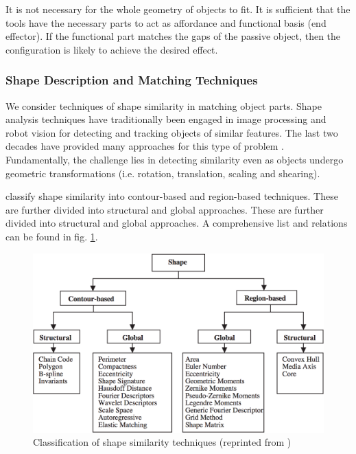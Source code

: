 \documentclass[
    floatsintext
]{article}
\begin{document}
It is not necessary for the whole geometry of objects to fit. 
It is sufficient that the tools have the necessary parts to act as affordance and functional basis (end effector\cite{zhu2015}).
If the functional part matches the gaps of the passive object, then the configuration is likely to achieve the desired effect. 

\subsubsection{Shape Description and Matching Techniques}
We consider techniques of shape similarity in matching object parts.
Shape analysis techniques have traditionally been engaged in image processing and robot vision for detecting and tracking objects of similar features.
The last two decades have provided many approaches for this type of problem \cite{loncaric1998,zhang2004,veltkamp2001,robert2012}.
Fundamentally, the challenge lies in detecting similarity even as objects undergo geometric transformations (i.e. rotation, translation, scaling and shearing).     

\cite{zhang2004} classify shape similarity into contour-based and region-based techniques. These are further divided into structural and global approaches.
These are further divided into structural and global approaches.
A comprehensive list and relations can be found in fig. \ref{fig:shape_similarity}. 

\begin{figure}[h]
  \centering
  \includegraphics[width=1\textwidth]{./figures/similarity_techniques.png}
  \caption{Classification of shape similarity techniques (reprinted from \cite{zhang2004})}
  \label{fig:shape_similarity}
\end{figure}  
\end{document}
